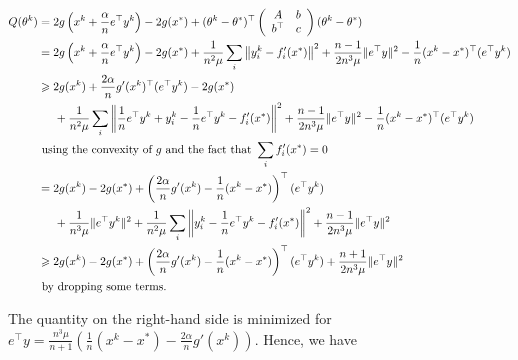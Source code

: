 \documentclass{article}
\begin{document}
\begin{align*}
Q(\theta^k) &= 2 g \left(x^k + \frac{\alpha}{n} e^\top y^k\right) - 2 g(x^\ast) +
(\theta^k - \theta^\ast)^\top
\left(
\begin{array}{cc} A & b \\ b^\top & c
\end{array}
\right)
(\theta^k - \theta^\ast)\\
&= 2 g \left(x^k + \frac{\alpha}{n} e^\top y^k\right) - 2 g(x^\ast) + \frac{1}{n^2\mu}\sum_i\left\|y_i^k - f_i'(x^\ast)\right\|^2 + \frac{n-1}{2n^3\mu}\|e^\top y\|^2 - \frac{1}{n} (x^k - x^\ast)^\top (e^\top y^k)\\
& \geqslant 2 g(x^k) + \frac{2\alpha}{n}g'(x^k)^\top (e^\top y^k) - 2 g(x^\ast)\\
&\hspace*{.5cm} + \frac{1}{n^2\mu}\sum_i\left\|\frac{1}{n}e^\top y^k + y_i^k -\frac{1}{n}e^\top y^k - f_i'(x^\ast)\right\|^2 + \frac{n-1}{2n^3\mu}\|e^\top y\|^2 - \frac{1}{n} (x^k - x^\ast)^\top (e^\top y^k)\\
& \mbox{ using the convexity of } g \mbox{ and the fact that } \sum_{i} f_i'(x^\ast)=0\\
&= 2 g(x^k) - 2 g(x^\ast) + \left(\frac{2\alpha}{n}g'(x^k) - \frac{1}{n} (x^k - x^\ast)\right)^\top (e^\top y^k)\\
&\hspace*{.5cm} + \frac{1}{n^3\mu} \|e^\top y^k\|^2 + \frac{1}{n^2\mu}\sum_i\left\|y_i^k -\frac{1}{n}e^\top y^k - f_i'(x^\ast)\right\|^2 + \frac{n-1}{2n^3\mu}\|e^\top y\|^2\\
&\geqslant 2 g(x^k) - 2 g(x^\ast) + \left(\frac{2\alpha}{n}g'(x^k) - \frac{1}{n} (x^k - x^\ast)\right)^\top (e^\top y^k) + \frac{n+1}{2n^3\mu}\|e^\top y\|^2 \; \\
& \mbox{ by dropping some terms.}\\
\end{align*}

The quantity on the right-hand side is minimized for $e^\top y = \frac{n^3\mu}{n+1}\left(\frac{1}{n} (x^k - x^\ast) - \frac{2\alpha}{n}g'(x^k)\right)$. Hence, we have
\end{document}
